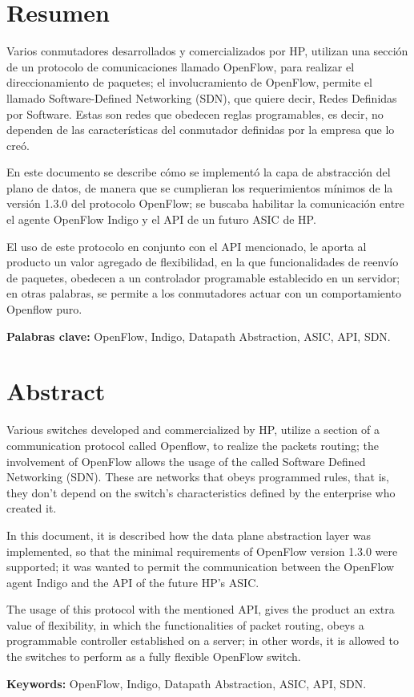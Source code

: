 \chapter*{Resumen}
\thispagestyle{empty}

Varios conmutadores desarrollados y comercializados por HP, utilizan una sección de un protocolo de comunicaciones llamado OpenFlow, para realizar el direccionamiento de paquetes; el involucramiento de OpenFlow, permite el llamado Software-Defined Networking (SDN), que quiere decir, Redes Definidas por Software. Estas son redes que obedecen reglas programables, es decir, no dependen de las características del conmutador definidas por la empresa que lo creó.

En este documento se describe cómo se implementó la capa de abstracción del plano de datos, de manera que se cumplieran los requerimientos mínimos de la versión 1.3.0 del protocolo OpenFlow; se buscaba habilitar la comunicación entre el agente OpenFlow Indigo y el API de un futuro ASIC de HP. 

El uso de este protocolo en conjunto con el API mencionado, le aporta al producto un valor agregado de flexibilidad, en la que funcionalidades de reenvío de paquetes, obedecen a un controlador programable establecido en un servidor; en otras palabras, se permite a los conmutadores actuar con un comportamiento Openflow puro.

\bigskip

\textbf{Palabras clave:} OpenFlow, Indigo, Datapath Abstraction, ASIC, API, SDN.

\clearpage
\chapter*{Abstract}
\thispagestyle{empty}

Various switches developed and commercialized by HP, utilize a section of a communication protocol called Openflow, to realize the packets routing; the involvement of OpenFlow allows the usage of the called Software Defined Networking (SDN). These are networks that obeys programmed rules, that is, they don't depend on the switch's characteristics defined by the enterprise who created it.

In this document, it is described how the data plane abstraction layer was implemented, so that the minimal requirements of OpenFlow version 1.3.0 were supported; it was wanted to permit the communication between the OpenFlow agent Indigo and the API of the future HP's ASIC.

The usage of this protocol with the mentioned API, gives the product an extra value of flexibility, in which the functionalities of packet routing, obeys a programmable controller established on a server; in other words, it is allowed to the switches to perform as a fully flexible OpenFlow switch. 

\bigskip

\textbf{Keywords:} OpenFlow, Indigo, Datapath Abstraction, ASIC, API, SDN.

\cleardoublepage

